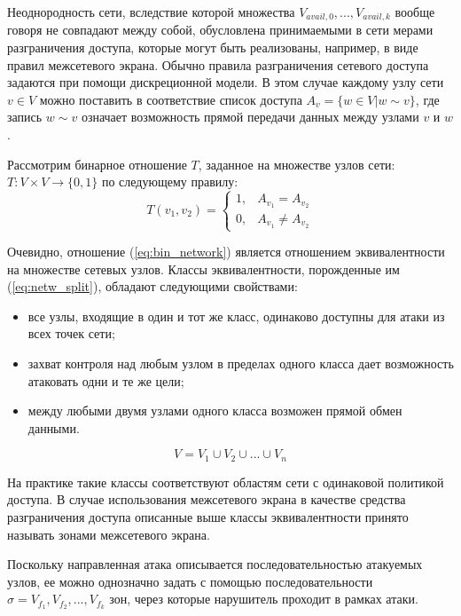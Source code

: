 Неоднородность сети, вследствие которой множества $V_{avail,0}, ... , V_{avail,k}$ вообще говоря не совпадают между собой, обусловлена принимаемыми в сети мерами разграничения доступа, которые могут быть реализованы, например, в виде правил межсетевого экрана. Обычно правила разграничения сетевого доступа задаются при помощи дискреционной модели. В этом случае каждому узлу сети $v \in V$ можно поставить в соответствие список доступа $A_v = \{ w \in V | w \sim v \}$, где запись $w \sim v$ означает возможность прямой передачи данных между узлами $v$ и $w$.
 
Рассмотрим бинарное отношение $T$, заданное на множестве узлов сети: $T: V \times V \rightarrow \{0, 1\}$ по следующему правилу:
\begin{equation}
\label{eq:bin_network}
T(v_1, v_2) = 
	\begin{cases} 
		1,  & A_{v_1} = A_{v_2} \\
		0,  & A_{v_1} \neq A_{v_2} 
	\end{cases}
\end{equation}

Очевидно, отношение (\ref{eq:bin_network}) является отношением эквивалентности на множестве сетевых узлов. Классы эквивалентности, порожденные им (\ref{eq:netw_split}), обладают следующими свойствами: 

\begin{itemize}
	\item все узлы, входящие в один и тот же класс, одинаково доступны для атаки из всех точек сети;
	\item захват контроля над любым узлом в пределах одного класса дает возможность атаковать одни и те же цели;
	\item между любыми двумя узлами одного класса возможен прямой обмен данными.
\end{itemize}

\begin{equation}
\label{eq:netw_split}
V = V_1 \cup V_2 \cup ... \cup V_n
\end{equation}

На практике такие классы соответствуют областям сети с одинаковой политикой доступа. В случае использования межсетевого экрана в качестве средства разграничения доступа описанные выше классы эквивалентности принято называть зонами межсетевого экрана.

Поскольку направленная атака описывается последовательностью атакуемых узлов, ее можно однозначно задать с помощью последовательности $\sigma = V_{f_1}, V_{f_2}, ... , V_{f_k}$ зон, через которые нарушитель проходит в рамках атаки.

